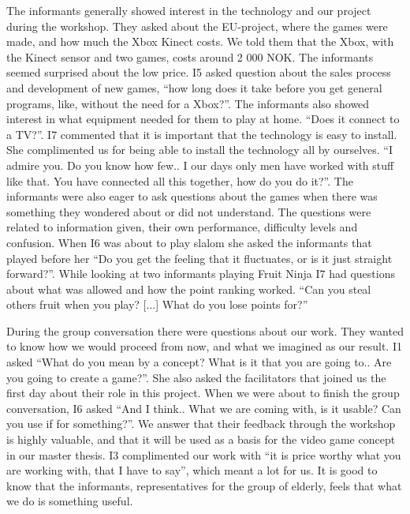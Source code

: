 The informants generally showed interest in the technology and our project during the workshop. They asked about the EU-project, where the games were made, and how much the Xbox Kinect costs. We told them that the Xbox, with the Kinect sensor and two games, costs around 2 000 NOK. The informants seemed surprised about the low price. I5 asked question about the sales process and development of new games, “how long does it take before you get general programs, like, without the need for a Xbox?”. The informants also showed interest in what equipment needed for them to play at home. “Does it connect to a TV?”. I7 commented that it is important that the technology is easy to install. She complimented us for being able to install the technology all by ourselves. “I admire you. Do you know how few.. I our days only men have worked with stuff like that. You have connected all this together, how do you do it?”.  The informants were also eager to ask questions about the games when there was something they wondered about or did not understand. The questions were related to information given, their own performance, difficulty levels and confusion. When I6 was about to play slalom she asked the informants that played before her “Do you get the feeling that it fluctuates, or is it just straight forward?”. While looking at two informants playing Fruit Ninja I7 had questions about what was allowed and how the point ranking worked. “Can you steal others fruit when you play? [...] What do you lose points for?” 

During the group conversation there were questions about our work. They wanted to know how we would proceed from now, and what we imagined as our result. I1 asked “What do you mean by a concept? What is it that you are going to.. Are you going to create a game?”. She also asked the facilitators that joined us the first day about their role in this project. When we were about to finish the group conversation, I6 asked “And I think.. What we are coming with, is it usable? Can you use if for something?”. We answer that their feedback through the workshop is highly valuable, and that it will be used as a basis for the video game concept in our master thesis.  I3 complimented our work with “it is price worthy what you are working with, that I have to say”, which meant a lot for us. It is good to know that the informants, representatives for the group of elderly, feels that what we do is something useful.  



